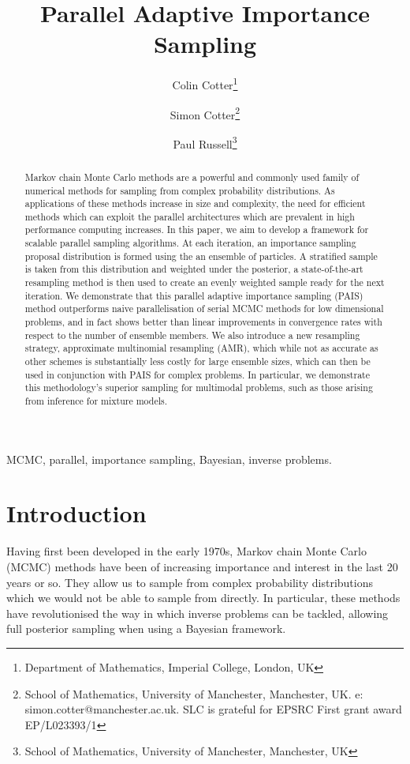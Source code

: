 \documentclass[final]{siamltex}
\author{Colin Cotter\thanks{Department of Mathematics, Imperial
    College, London, UK} \and Simon Cotter\thanks{School of
    Mathematics, University of Manchester, Manchester, UK. e:
    simon.cotter@manchester.ac.uk. SLC is grateful for EPSRC First
    grant award EP/L023393/1} \and Paul Russell\thanks{School of
    Mathematics, University of Manchester, Manchester, UK}}
\title{Parallel Adaptive Importance Sampling}
\begin{document}
\maketitle
\begin{abstract}
  Markov chain Monte Carlo methods are a powerful and commonly used
  family of numerical methods for sampling from complex probability
  distributions. As applications of these methods increase in size and
  complexity, the need for efficient methods which can exploit the
  parallel architectures which are prevalent in high performance
  computing increases. In this paper, we aim to develop a framework
  for scalable parallel sampling algorithms. At each iteration, an
  importance sampling proposal distribution is formed using the
  an ensemble of particles. A stratified sample is taken from this
  distribution and weighted under the posterior, a state-of-the-art
  resampling method is then used to create an evenly weighted sample
  ready for the next iteration. We demonstrate that this parallel
  adaptive importance sampling (PAIS) method outperforms naive
  parallelisation of serial MCMC methods for low dimensional problems,
  and in fact shows
  better than linear improvements in convergence rates with respect to
  the number of ensemble members. We also introduce a new resampling
  strategy, approximate multinomial resampling (AMR), which while not
  as accurate as other schemes is substantially less costly for large
  ensemble sizes, which can then be used in conjunction with PAIS for
  complex problems. In particular, we demonstrate this methodology's
  superior sampling for multimodal problems, such as those arising
  from inference for mixture models.
\end{abstract}
\begin{keywords}MCMC, parallel, importance sampling, Bayesian, inverse problems.
\end{keywords}
\section{Introduction}
Having first been developed in the early 1970s\cite{hastings1970monte}, Markov chain Monte Carlo (MCMC) methods have been of increasing
importance and interest in the last 20 years or so. They allow us to
sample from complex probability distributions which we would not be
able to sample from directly. In particular, these methods have
revolutionised the way in which inverse problems can be tackled,
allowing full posterior sampling when using a Bayesian framework. 
\end{document}
